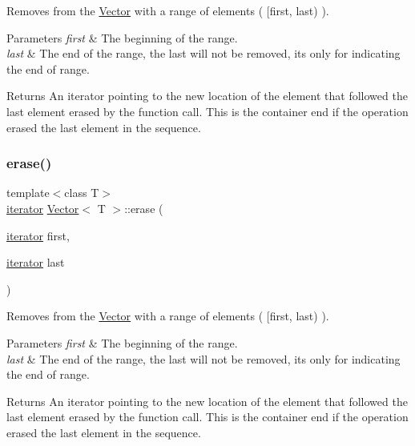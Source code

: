 Removes from the \hyperlink{classVector}{Vector} with a range of elements ( \mbox{[}first, last) ). 


\begin{DoxyParams}{Parameters}
{\em first} & The beginning of the range. \\
\hline
{\em last} & The end of the range, the \textquotesingle{}last\textquotesingle{} will not be removed, it\textquotesingle{}s only for indicating the end of range. \\
\hline
\end{DoxyParams}
\begin{DoxyReturn}{Returns}
An iterator pointing to the new location of the element that followed the last element erased by the function call. This is the container end if the operation erased the last element in the sequence. 
\end{DoxyReturn}
\mbox{\label{classVector_afd90059f9dff48f4417b51f6eae8e152}} 
\subsubsection{\texorpdfstring{erase()}{erase()}\hspace{0.1cm}{\footnotesize\ttfamily [4/6]}}
{\footnotesize\ttfamily template$<$class T$>$ \\
\hyperlink{classVector_a45531016f99e90887e0f890f2da943e4}{iterator} \hyperlink{classVector}{Vector}$<$ T $>$\+::erase (\begin{DoxyParamCaption}\item[{\hyperlink{classVector_a45531016f99e90887e0f890f2da943e4}{iterator}}]{first,  }\item[{\hyperlink{classVector_a45531016f99e90887e0f890f2da943e4}{iterator}}]{last }\end{DoxyParamCaption})\hspace{0.3cm}{\ttfamily [inline]}}



Removes from the \hyperlink{classVector}{Vector} with a range of elements ( \mbox{[}first, last) ). 


\begin{DoxyParams}{Parameters}
{\em first} & The beginning of the range. \\
\hline
{\em last} & The end of the range, the \textquotesingle{}last\textquotesingle{} will not be removed, it\textquotesingle{}s only for indicating the end of range. \\
\hline
\end{DoxyParams}
\begin{DoxyReturn}{Returns}
An iterator pointing to the new location of the element that followed the last element erased by the function call. This is the container end if the operation erased the last element in the sequence. 
\end{DoxyReturn}
\mbox{\label{classVector_ab1947437ba829a39c6fd20ada89ec892}} 
